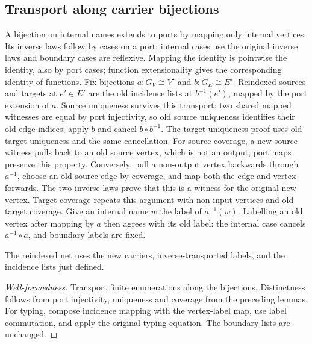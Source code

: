 \subsection{Transport along carrier bijections}
A bijection on internal names extends to ports by mapping only internal vertices.
Its inverse laws follow by cases on a port: internal cases use the original
inverse laws and boundary cases are reflexive. Mapping the identity is pointwise
the identity, also by port cases; function extensionality gives the corresponding
identity of functions.
Fix bijections $a:G_V\cong V'$ and $b:G_E\cong E'$. Reindexed sources and targets
at $e'\in E'$ are the old incidence lists at $b^{-1}(e')$, mapped by the port
extension of $a$.
Source uniqueness survives this transport: two shared mapped witnesses are equal
by port injectivity, so old source uniqueness identifies their old edge indices;
apply $b$ and cancel $b\circ b^{-1}$. The target uniqueness proof uses old target
uniqueness and the same cancellation.
For source coverage, a new source witness pulls back to an old source vertex,
which is not an output; port maps preserve this property. Conversely, pull a
non-output vertex backwards through $a^{-1}$, choose an old source edge by
coverage, and map both the edge and vertex forwards. The two inverse laws prove
that this is a witness for the original new vertex. Target coverage repeats this
argument with non-input vertices and old target coverage.
Give an internal name $w$ the label of $a^{-1}(w)$. Labelling an old vertex after
mapping by $a$ then agrees with its old label: the internal case cancels
$a^{-1}\circ a$, and boundary labels are fixed.
\begin{definition}\label{term:reindexing}
The reindexed net uses the new carriers, inverse-transported labels, and the
incidence lists just defined.
\end{definition}
\begin{proof}[Well-formedness]
Transport finite enumerations along the bijections. Distinctness follows from
port injectivity, uniqueness and coverage from the preceding lemmas. For typing,
compose incidence mapping with the vertex-label map, use label commutation, and
apply the original typing equation. The boundary lists are unchanged.
\end{proof}

